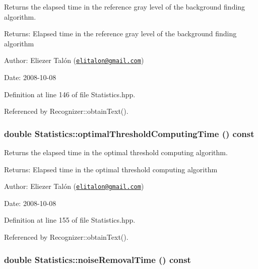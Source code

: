 Returns the elapsed time in the reference gray level of the background finding algorithm. 

\begin{Desc}
\item[Returns:]Elapsed time in the reference gray level of the background finding algorithm\end{Desc}
\begin{Desc}
\item[Author:]Eliezer Talón (\href{mailto:elitalon@gmail.com}{\tt elitalon@gmail.com}) \end{Desc}
\begin{Desc}
\item[Date:]2008-10-08 \end{Desc}


Definition at line 146 of file Statistics.hpp.

Referenced by Recognizer::obtainText().\hypertarget{class_statistics_ca10ccbc4137e9ad184ff6dc9a3e5a46}{
\subsubsection[optimalThresholdComputingTime]{\setlength{\rightskip}{0pt plus 5cm}double Statistics::optimalThresholdComputingTime () const}}
\label{class_statistics_ca10ccbc4137e9ad184ff6dc9a3e5a46}


Returns the elapsed time in the optimal threshold computing algorithm. 

\begin{Desc}
\item[Returns:]Elapsed time in the optimal threshold computing algorithm\end{Desc}
\begin{Desc}
\item[Author:]Eliezer Talón (\href{mailto:elitalon@gmail.com}{\tt elitalon@gmail.com}) \end{Desc}
\begin{Desc}
\item[Date:]2008-10-08 \end{Desc}


Definition at line 155 of file Statistics.hpp.

Referenced by Recognizer::obtainText().\hypertarget{class_statistics_25b35c7f7f33d55ee86f4e7ba6cd0c48}{
\subsubsection[noiseRemovalTime]{\setlength{\rightskip}{0pt plus 5cm}double Statistics::noiseRemovalTime () const}}
\label{class_statistics_25b35c7f7f33d55ee86f4e7ba6cd0c48}


